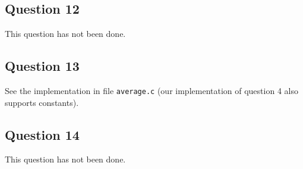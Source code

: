 
\subsection*{Question 12}

This question has not been done.


\subsection*{Question 13}

See the implementation in file \texttt{average.c} (our implementation of question 4 also supports constants).


\subsection*{Question 14}

This question has not been done.


